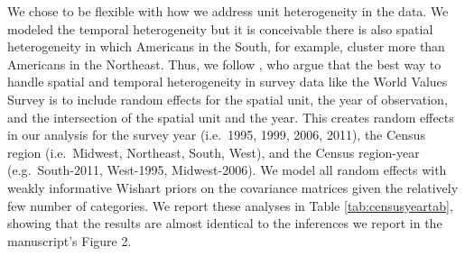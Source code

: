 \documentclass[11pt,]{article}
\begin{document}
We chose to be flexible with how we address unit heterogeneity in the
data. We modeled the temporal heterogeneity but it is conceivable there
is also spatial heterogeneity in which Americans in the South, for
example, cluster more than Americans in the Northeast. Thus, we follow
\citet{schmidtcatranfairbrother2015remm}, who argue that the best way to
handle spatial and temporal heterogeneity in survey data like the World
Values Survey is to include random effects for the spatial unit, the
year of observation, and the intersection of the spatial unit and the
year. This creates random effects in our analysis for the survey year
(i.e.~1995, 1999, 2006, 2011), the Census region (i.e.~Midwest,
Northeast, South, West), and the Census region-year (e.g.~South-2011,
West-1995, Midwest-2006). We model all random effects with weakly
informative Wishart priors on the covariance matrices
\citep[c.f.][]{chungetal2015wip} given the relatively few number of
categories. We report these analyses in Table \ref{tab:censusyeartab},
showing that the results are almost identical to the inferences we
report in the manuscript's Figure 2.

 
  \providecommand{\huxb}[2]{\arrayrulecolor[RGB]{#1}\global\arrayrulewidth=#2pt}
  \providecommand{\huxvb}[2]{\color[RGB]{#1}\vrule width #2pt}
  \providecommand{\huxtpad}[1]{\rule{0pt}{\baselineskip+#1}}
  \providecommand{\huxbpad}[1]{\rule[-#1]{0pt}{#1}}
\end{document}
